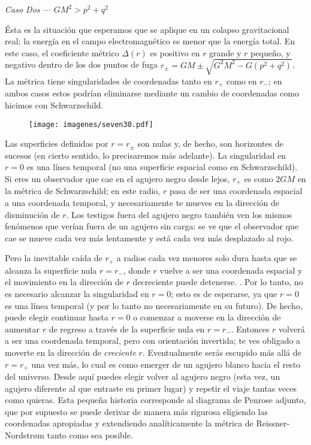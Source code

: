\documentclass[11pt,b5paper,openany,twoside]{book}
\begin{document}
\noindent
{\it Caso Dos} --- $GM^2>p^2+q^2$

Ésta es la situación que esperamos que se aplique en un colapso gravitacional real; la energía en el campo electromagnético es menor que la energía total.
En este caso, el coeficiente métrico $\Delta(r)$ es positivo en $r$ grande y $r$ pequeño, y negativo dentro de los dos puntos de fuga $r_\pm = GM\pm \sqrt{G^2M^2 - G(p^2+q^2)}$.
La métrica tiene singularidades de coordenadas tanto en $r_+$ como en $r_-$; en ambos casos estos podrían eliminarse mediante un cambio de coordenadas como hicimos con Schwarzschild.

\begin{figure}[h]
\centering
\texttt{[image: imagenes/seven30.pdf]}
\end{figure}

Las superficies definidas por $r=r_\pm$ son nulas y, de hecho, son horizontes de sucesos (en cierto sentido, lo precisaremos más adelante).
La singularidad en $r=0$ es una línea temporal (no una superficie espacial como en Schwarzschild).
Si eres un observador que cae en el agujero negro desde lejos, $r_+$ es como $2GM$ en la métrica de Schwarzschild; en este radio, $r$ pasa de ser una coordenada espacial a una coordenada temporal, y necesariamente te mueves en la dirección de disminución de $r$.
Los testigos fuera del agujero negro también ven los mismos fenómenos que verían fuera de un agujero sin carga: se ve que el observador que cae se mueve cada vez más lentamente y está cada vez más desplazado al rojo.

Pero la inevitable caída de $r_+$ a radios cada vez menores solo dura hasta que se alcanza la superficie nula $r=r_-$, donde $r$ vuelve a ser una coordenada espacial y el movimiento en la dirección de $r$ decreciente puede detenerse. .
Por lo tanto, no es necesario alcanzar la singularidad en $r=0$; esto es de esperarse, ya que $r=0$ es una línea temporal (y por lo tanto no necesariamente en su futuro).
De hecho, puede elegir continuar hasta $r=0$ o comenzar a moverse en la dirección de aumentar $r$ de regreso a través de la superficie nula en $r=r_-$.
Entonces $r$ volverá a ser una coordenada temporal, pero con orientación invertida; te ves obligado a moverte en la dirección de {\it creciente} $r$.
Eventualmente serás escupido más allá de $r=r_+$ una vez más, lo cual es como emerger de un agujero blanco hacia el resto del universo.
Desde aquí puedes elegir volver al agujero negro (esta vez, un agujero diferente al que entraste en primer lugar) y repetir el viaje tantas veces como quieras.
Esta pequeña historia corresponde al diagrama de Penrose adjunto, que por supuesto se puede derivar de manera más rigurosa eligiendo las coordenadas apropiadas y extendiendo analíticamente la métrica de Reissner-Nordstr{\o}m tanto como sea posible.
\end{document}
